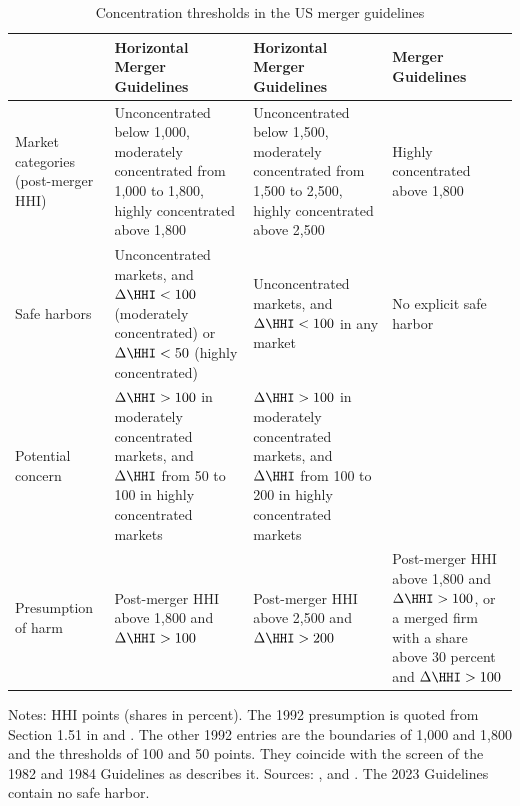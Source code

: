 \begin{table}[htbp]
\centering
\caption{Concentration thresholds in the US merger guidelines}
\label{tab:11-guidelines}
\footnotesize
\begin{tabularx}{\textwidth}{@{}>{\raggedright\arraybackslash}p{2.3cm}*{3}{>{\raggedright\arraybackslash}X}@{}}
\toprule
 & 1992 Horizontal Merger Guidelines & 2010 Horizontal Merger Guidelines & 2023 Merger Guidelines \\
\midrule
Market categories (post-merger HHI) &
Unconcentrated below 1,000, moderately concentrated from 1,000 to 1,800, highly concentrated above 1,800 &
Unconcentrated below 1,500, moderately concentrated from 1,500 to 2,500, highly concentrated above 2,500 &
Highly concentrated above 1,800 \\[3pt]
Safe harbors &
Unconcentrated markets, and $\Delta\HHI < 100$ (moderately concentrated) or $\Delta\HHI < 50$ (highly
concentrated) &
Unconcentrated markets, and $\Delta\HHI < 100$ in any market &
No explicit safe harbor \\[3pt]
Potential concern &
$\Delta\HHI > 100$ in moderately concentrated markets, and $\Delta\HHI$ from 50 to 100 in highly
concentrated markets &
$\Delta\HHI > 100$ in moderately concentrated markets, and $\Delta\HHI$ from 100 to 200 in highly concentrated
markets &
\\[3pt]
Presumption of harm &
Post-merger HHI above 1,800 and $\Delta\HHI > 100$ &
Post-merger HHI above 2,500 and $\Delta\HHI > 200$ &
Post-merger HHI above 1,800 and $\Delta\HHI > 100$, or a merged firm with a share above 30 percent and
$\Delta\HHI > 100$ \\
\bottomrule
\end{tabularx}

\vspace{3pt}
\begin{minipage}{\textwidth}
\footnotesize Notes: HHI points (shares in percent). The 1992 presumption is quoted from Section 1.51 in
\citet[p.~11, n.~25]{AshenfelterHosken2008} and \citet[p.~26]{FarrellShapiro2010}. The other 1992 entries are the
boundaries of 1,000 and 1,800 and the thresholds of 100 and 50 points. They coincide with the screen of the 1982 and
1984 Guidelines as \citet[pp.~5--6]{Nevo2000b} describes it. Sources: \citet[Section~1.51]{USDOJFTC1992},
\citet[Section~5.3]{USDOJFTC2010} and \citet[Section~2.1]{USDOJFTC2023}. The 2023 Guidelines contain no safe harbor.
\end{minipage}
\end{table}

